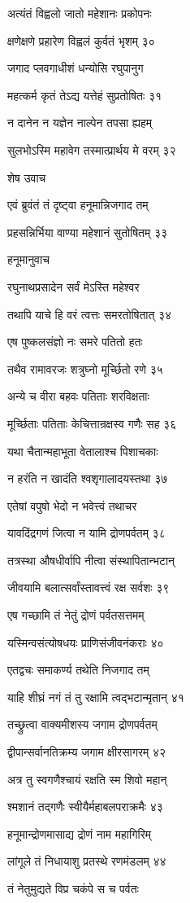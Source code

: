 अत्यंतं विह्वलो जातो महेशानः प्रकोपनः

क्षणेक्षणे प्रहारेण विह्वलं कुर्वतं भृशम् ३०

जगाद प्लवगाधीशं धन्योसि रघुपानुग

महत्कर्म कृतं तेऽद्य यत्तेहं सुप्रतोषितः ३१

न दानेन न यज्ञेन नाल्पेन तपसा ह्यहम्

सुलभोऽस्मि महावेग तस्मात्प्रार्थय मे वरम् ३२

शेष उवाच

एवं ब्रुवंतं तं दृष्ट्वा हनूमान्निजगाद तम्

प्रहसन्निर्भिया वाण्या महेशानं सुतोषितम् ३३

हनूमानुवाच

रघुनाथप्रसादेन सर्वं मेऽस्ति महेश्वर

तथापि याचे हि वरं त्वत्तः समरतोषितात् ३४

एष पुष्कलसंज्ञो नः समरे पतितो हतः

तथैव रामावरजः शत्रुघ्नो मूर्च्छितो रणे ३५

अन्ये च वीरा बहवः पतिताः शरविक्षताः

मूर्च्छिताः पतिताः केचित्तान्रक्षस्व गणैः सह ३६

यथा चैतान्महाभूता वेतालाश्च पिशाचकाः

न हरंति न खादंति श्वशृगालादयस्तथा ३७

एतेषां वपुषो भेदो न भवेत्त्वं तथाचर

यावदिंद्रगणं जित्वा न यामि द्रोणपर्वतम् ३८

तत्रस्था औषधीर्वापि नीत्वा संस्थापितान्भटान्

जीवयामि बलात्सर्वांस्तावत्त्वं रक्ष सर्वशः ३९

एष गच्छामि तं नेतुं द्रोणं पर्वतसत्तमम्

यस्मिन्वसंत्योषधयः प्राणिसंजीवनंकराः ४०

एतद्वचः समाकर्ण्य तथेति निजगाद तम्

याहि शीघ्रं नगं तं तु रक्षामि त्वद्भटान्मृतान् ४१

तच्छ्रुत्वा वाक्यमीशस्य जगाम द्रोणपर्वतम्

द्वीपान्सर्वानतिक्रम्य जगाम क्षीरसागरम् ४२

अत्र तु स्वगणैश्चायं रक्षति स्म शिवो महान्

श्मशानं तद्गणैः स्वीयैर्महाबलपराक्रमैः ४३

हनूमान्द्रोणमासाद्य द्रोणं नाम महागिरिम्

लांगूले तं निधायाशु प्रतस्थे रणमंडलम् ४४

तं नेतुमुद्यते विप्र चकंपे स च पर्वतः

